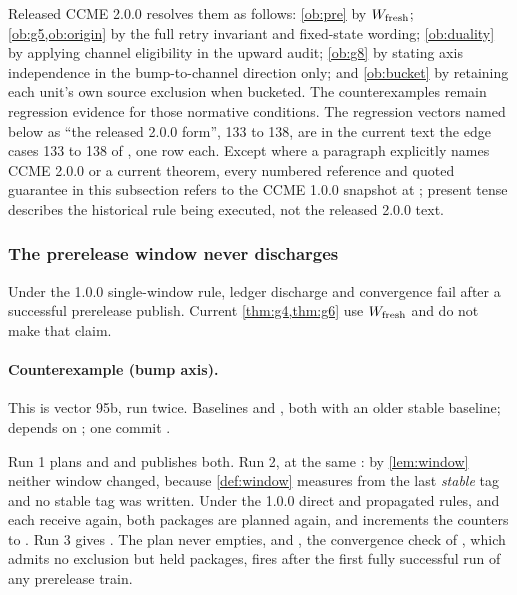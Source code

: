 Released CCME 2.0.0 resolves them as follows: \cref{ob:pre} by $W_{\rm fresh}$;
\cref{ob:g5,ob:origin} by the full retry invariant and fixed-state wording;
\cref{ob:duality} by applying channel eligibility in the upward audit;
\cref{ob:g8} by stating axis independence in the bump-to-channel direction
only; and \cref{ob:bucket} by retaining each unit's own source exclusion when
bucketed. The counterexamples remain regression evidence for those normative
conditions. The regression vectors named below as ``the released 2.0.0
form'', 133 to 138, are in the current text the edge cases 133 to 138 of
, one row each. Except where a paragraph explicitly names CCME 2.0.0 or a current
theorem, every numbered \spec{} reference and quoted guarantee in this subsection
refers to the CCME 1.0.0 snapshot at ; present tense describes
the historical rule being executed, not the released 2.0.0 text.

\subsubsection{The prerelease window never discharges}

\begin{obligation}
\label{ob:pre}
Under the 1.0.0 single-window rule, ledger discharge and convergence fail after a successful prerelease publish. Current \cref{thm:g4,thm:g6} use $W_{\rm fresh}$ and do not make that claim.
\end{obligation}

\paragraph{Counterexample (bump axis).}
This is \SPEC{} vector 95b, run twice. Baselines
 and , both with an older stable
baseline;  depends on ; one commit
.

Run 1 plans  and  and publishes
both. Run 2, at the same \Head{}: by \cref{lem:window} neither window changed,
because \cref{def:window} measures from the last \emph{stable} tag and no
stable tag was written. Under the 1.0.0 direct and propagated rules,  and  each receive \bpatch{} again, both packages are planned again, and
 increments the counters to . Run 3 gives
. The plan never empties, and , the convergence
check of , which admits no exclusion but held packages, fires
after the first fully successful run of any prerelease train.

